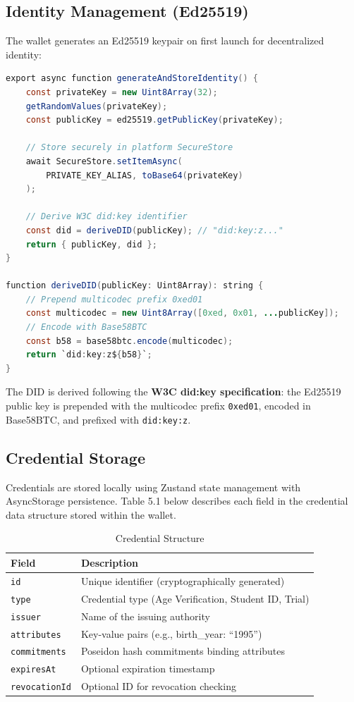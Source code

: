\subsection{Identity Management (Ed25519)}

The wallet generates an Ed25519 keypair on first launch for decentralized identity:

\begin{lstlisting}[language=Java, caption={Identity Generation (wallet.ts)}]
export async function generateAndStoreIdentity() {
    const privateKey = new Uint8Array(32);
    getRandomValues(privateKey);
    const publicKey = ed25519.getPublicKey(privateKey);
    
    // Store securely in platform SecureStore
    await SecureStore.setItemAsync(
        PRIVATE_KEY_ALIAS, toBase64(privateKey)
    );
    
    // Derive W3C did:key identifier
    const did = deriveDID(publicKey); // "did:key:z..."
    return { publicKey, did };
}

function deriveDID(publicKey: Uint8Array): string {
    // Prepend multicodec prefix 0xed01
    const multicodec = new Uint8Array([0xed, 0x01, ...publicKey]);
    // Encode with Base58BTC
    const b58 = base58btc.encode(multicodec);
    return `did:key:z${b58}`;
}
\end{lstlisting}

The DID is derived following the \textbf{W3C did:key specification}: the Ed25519 public key is prepended with the multicodec prefix \texttt{0xed01}, encoded in Base58BTC, and prefixed with \texttt{did:key:z}.

\subsection{Credential Storage}

Credentials are stored locally using Zustand state management with AsyncStorage persistence. Table 5.1 below describes each field in the credential data structure stored within the wallet.

\begin{table}[H]
\centering
\caption{Credential Structure}
\begin{tabular}{|l|p{8cm}|}
\hline
\textbf{Field} & \textbf{Description} \\
\hline
\texttt{id} & Unique identifier (cryptographically generated) \\
\texttt{type} & Credential type (Age Verification, Student ID, Trial) \\
\texttt{issuer} & Name of the issuing authority \\
\texttt{attributes} & Key-value pairs (e.g., birth\_year: ``1995'') \\
\texttt{commitments} & Poseidon hash commitments binding attributes \\
\texttt{expiresAt} & Optional expiration timestamp \\
\texttt{revocationId} & Optional ID for revocation checking \\
\hline
\end{tabular}
\end{table}

